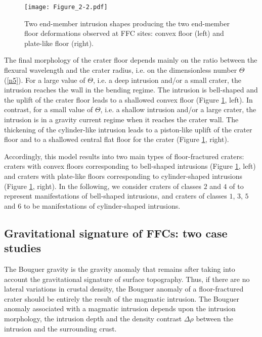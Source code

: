 \begin{figure}[pb]
    \graphicspath{ {/Users/thorey/Documents/These/Projet/FFC/Gravi_GRAIL/Article/Papier/Proof/} }
  \begin{center}
    \texttt{[image: Figure\_2-2.pdf]}
    \caption{Two  end-member   intrusion  shapes  producing   the  two
      end-member  floor deformations  observed  at  FFC sites:  convex
      floor (left) and plate-like floor (right).}
    \label{Figure2-2}
  \end{center}
\end{figure}

The final morphology  of the crater floor depends mainly  on the ratio
between the  flexural wavelength and  the crater radius, i.e.   on the
dimensionless  number  $\Theta$  (\ref{n5}).   For a  large  value  of
$\Theta$, i.e. a  deep intrusion and/or a small  crater, the intrusion
reaches the wall  in the bending regime. The  intrusion is bell-shaped
and the uplift  of the crater floor leads to  a shallowed convex floor
(Figure \ref{Figure2-2},  left).  In  contrast, for  a small  value of
$\Theta$,  i.e.   a  shallow  intrusion and/or  a  large  crater,  the
intrusion is  in a gravity current  regime when it reaches  the crater
wall.   The  thickening of  the  cylinder-like  intrusion leads  to  a
piston-like uplift of the crater floor and to a shallowed central flat
floor for the crater (Figure \ref{Figure2-2}, right).

Accordingly, this model results into two main types of floor-fractured
craters:  craters  with  convex floors  corresponding  to  bell-shaped
intrusions (Figure \ref{Figure2-2}, left)  and craters with plate-like
floors   corresponding    to   cylinder-shaped    intrusions   (Figure
\ref{Figure2-2},  right).  In  the following,  we consider  craters of
classes   $2$  and   $4$   of   \citet{Schultz:1976kt}  to   represent
manifestations of bell-shaped intrusions,  and craters of classes $1$,
$3$, $5$ and $6$ to be manifestations of cylinder-shaped intrusions.
 
\subsection{Gravitational signature of FFCs: two case studies}
\label{sec:grav-sign-ffcs-1}

The Bouguer gravity  is the gravity anomaly that  remains after taking
into account the gravitational signature of surface topography.  Thus,
if there  are no  lateral variations in  crustal density,  the Bouguer
anomaly of a  floor-fractured crater should be entirely  the result of
the  magmatic  intrusion.   The  Bouguer  anomaly  associated  with  a
magmatic  intrusion   depends  upon  the  intrusion   morphology,  the
intrusion depth  and the  density contrast  $\Delta \rho$  between the
intrusion and the surrounding crust.


